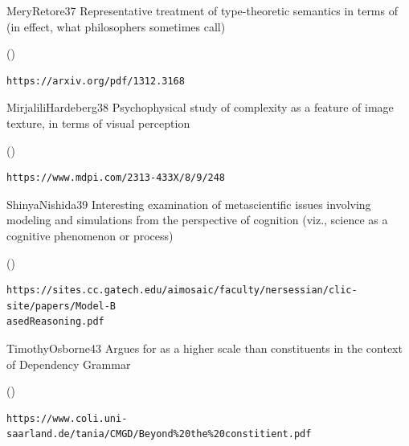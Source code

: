 \begin{bsuppItem}{MeryRetore}{37}
{Representative treatment of type-theoretic semantics 
in terms of (in effect, what philosophers sometimes call) }
\begin{lboxurl}(\currhref)
\begin{lstlisting}
https://arxiv.org/pdf/1312.3168
\end{lstlisting}
\end{lboxurl}
\end{bsuppItem}

\begin{bsuppItem}{MirjaliliHardeberg}{38}
{Psychophysical study of complexity as a feature of image 
texture, in terms of visual perception}
\begin{lboxurl}(\currhref)
\begin{lstlisting}
https://www.mdpi.com/2313-433X/8/9/248
\end{lstlisting}
\end{lboxurl}
\end{bsuppItem}

\begin{bsuppItem}{ShinyaNishida}{39}
{Interesting examination of metascientific issues involving 
modeling and simulations from the perspective of cognition 
(viz., science as a cognitive phenomenon or process)}
\begin{lboxurl}(\currhref)
\begin{lstlisting}
https://sites.cc.gatech.edu/aimosaic/faculty/nersessian/clic-site/papers/Model-B
asedReasoning.pdf
\end{lstlisting}
\end{lboxurl}
\end{bsuppItem}

\begin{bsuppItem}{TimothyOsborne}{43}
{Argues for  as a higher scale than constituents 
in the context of Dependency Grammar}
\begin{lboxurl}(\currhref)
\begin{lstlisting}
https://www.coli.uni-saarland.de/tania/CMGD/Beyond%20the%20constitient.pdf
\end{lstlisting}
\end{lboxurl}
\end{bsuppItem}


